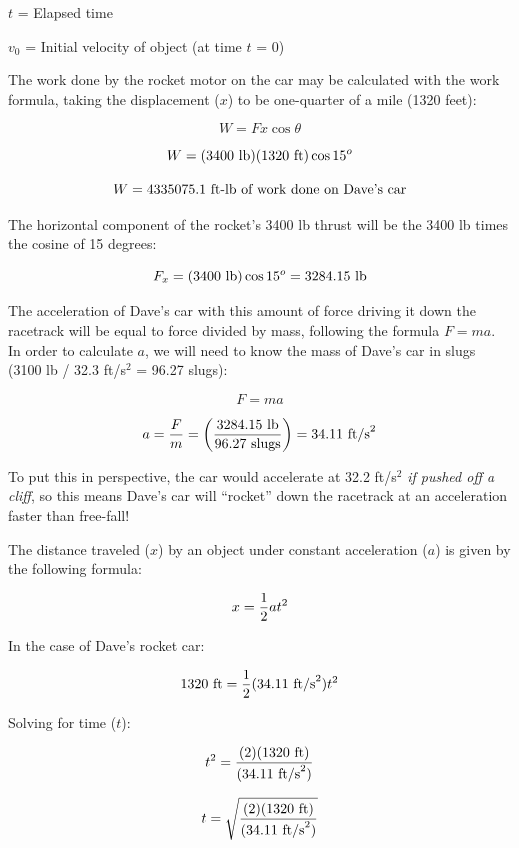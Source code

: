 $t$ = Elapsed time

$v_0$ = Initial velocity of object (at time $t$ = 0)

\vskip 10pt







The work done by the rocket motor on the car may be calculated with the work formula, taking the displacement ($x$) to be one-quarter of a mile (1320 feet):

$$W = F x \cos \theta$$

$$W = (3400 \hbox{ lb}) (1320 \hbox{ ft}) \cos 15^o$$

$$W = \hbox{4335075.1 ft-lb of work done on Dave's car}$$

\vskip 10pt

The horizontal component of the rocket's 3400 lb thrust will be the 3400 lb times the cosine of 15 degrees:

$$F_x = (3400 \hbox{ lb}) \cos 15^o = 3284.15 \hbox{ lb}$$

The acceleration of Dave's car with this amount of force driving it down the racetrack will be equal to force divided by mass, following the formula $F = ma$.  In order to calculate $a$, we will need to know the mass of Dave's car in slugs (3100 lb / 32.3 ft/s$^{2}$ = 96.27 slugs):

$$F = m a$$

$$a = {F \over m} = \left(3284.15 \hbox{ lb} \over 96.27 \hbox{ slugs}\right) = 34.11 \hbox{ ft/s}^2$$

To put this in perspective, the car would accelerate at 32.2 ft/s$^{2}$ {\it if pushed off a cliff}, so this means Dave's car will ``rocket'' down the racetrack at an acceleration faster than free-fall!

\vskip 10pt

The distance traveled ($x$) by an object under constant acceleration ($a$) is given by the following formula:

$$x = {1 \over 2} a t^2$$

In the case of Dave's rocket car:

$$1320 \hbox{ ft} = {1 \over 2} (34.11 \hbox{ ft/s}^2) t^2$$

Solving for time ($t$):

$$t^2 = {(2) (1320 \hbox{ ft}) \over (34.11 \hbox{ ft/s}^2)}$$

$$t = \sqrt{(2) (1320 \hbox{ ft}) \over (34.11 \hbox{ ft/s}^2)}$$


